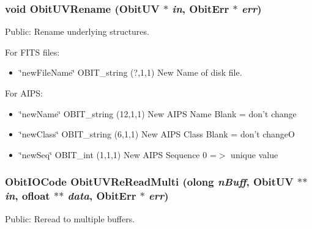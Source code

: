 \subsubsection{\setlength{\rightskip}{0pt plus 5cm}void Obit\-UVRename ({\bf Obit\-UV} $\ast$ {\em in}, {\bf Obit\-Err} $\ast$ {\em err})}\label{ObitUV_8c_a15}


Public: Rename underlying structures. 

For FITS files: \begin{itemize}
\item \char`\"{}new\-File\-Name\char`\"{} OBIT\_\-string (?,1,1) New Name of disk file.\end{itemize}
For AIPS: \begin{itemize}
\item \char`\"{}new\-Name\char`\"{} OBIT\_\-string (12,1,1) New AIPS Name Blank = don't change \item \char`\"{}new\-Class\char`\"{} OBIT\_\-string (6,1,1) New AIPS Class Blank = don't change\-O \item \char`\"{}new\-Seq\char`\"{} OBIT\_\-int (1,1,1) New AIPS Sequence 0 =$>$ unique value 
\end{itemize}
\subsubsection{\setlength{\rightskip}{0pt plus 5cm}Obit\-IOCode Obit\-UVRe\-Read\-Multi ({\bf olong} {\em n\-Buff}, {\bf Obit\-UV} $\ast$$\ast$ {\em in}, {\bf ofloat} $\ast$$\ast$ {\em data}, {\bf Obit\-Err} $\ast$ {\em err})}\label{ObitUV_8c_a24}


Public: Reread to multiple buffers. 

